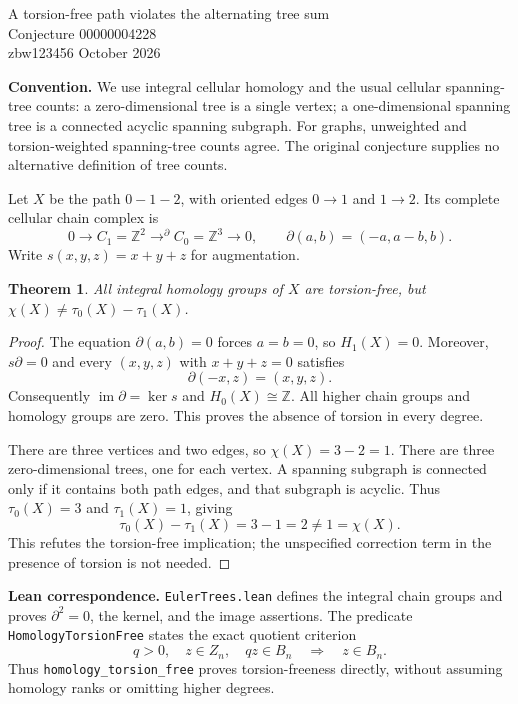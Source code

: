 \documentclass[11pt]{article}
\newtheorem{theorem}{Theorem}
\begin{document}
\begin{center}
{\Large A torsion-free path violates the alternating tree sum}\\[5pt]
{\large Conjecture 00000004228}\\[5pt]
zbw123456  October 2026
\end{center}
\textbf{Convention.} We use integral cellular homology and the usual
cellular spanning-tree counts: a zero-dimensional tree is a single vertex;
a one-dimensional spanning tree is a connected acyclic spanning subgraph.
For graphs, unweighted and torsion-weighted spanning-tree counts agree.
The original conjecture supplies no alternative definition of tree counts.

Let $X$ be the path $0\! -\! 1\! -\! 2$, with oriented edges $0\to1$ and
$1\to2$. Its complete cellular chain complex is
\[
0\longrightarrow C_1=\mathbb Z^2
\mathrel{\mathop{\longrightarrow}^{\partial}} C_0=\mathbb Z^3
\longrightarrow0,\qquad
\partial(a,b)=(-a,a-b,b).
\]
Write $s(x,y,z)=x+y+z$ for augmentation.

\begin{theorem}
All integral homology groups of $X$ are torsion-free, but
$\chi(X)\ne\tau_0(X)-\tau_1(X)$.
\end{theorem}
\begin{proof}
The equation $\partial(a,b)=0$ forces $a=b=0$, so $H_1(X)=0$.
Moreover, $s\partial=0$ and every $(x,y,z)$ with $x+y+z=0$ satisfies
\[
\partial(-x,z)=(x,y,z).
\]
Consequently $\operatorname{im}\partial=\ker s$ and $H_0(X)\cong\mathbb Z$.
All higher chain groups and homology groups are zero. This proves the
absence of torsion in every degree.

There are three vertices and two edges, so $\chi(X)=3-2=1$.
There are three zero-dimensional trees, one for each vertex.
A spanning subgraph is connected only if it contains both path edges,
and that subgraph is acyclic. Thus $\tau_0(X)=3$ and $\tau_1(X)=1$, giving
\[
\tau_0(X)-\tau_1(X)=3-1=2\ne1=\chi(X).
\]
This refutes the torsion-free implication; the unspecified correction
term in the presence of torsion is not needed.
\end{proof}

\textbf{Lean correspondence.} \texttt{EulerTrees.lean} defines the integral
chain groups and proves $\partial^2=0$, the kernel, and the image assertions.
The predicate \texttt{HomologyTorsionFree} states the exact quotient criterion
\[
q>0,\quad z\in Z_n,\quad qz\in B_n\quad\Longrightarrow\quad z\in B_n.
\]
Thus \texttt{homology\_torsion\_free} proves torsion-freeness directly, without
assuming homology ranks or omitting higher degrees.
\end{document}
